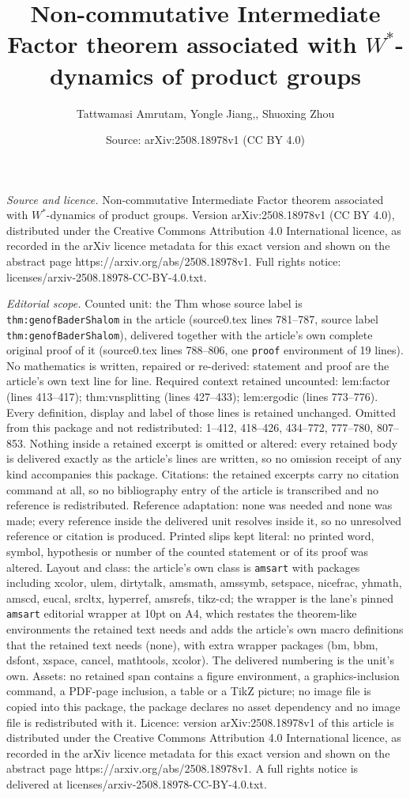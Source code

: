 \documentclass[10pt,a4paper]{amsart}
\title[Non-commutative Intermediate Factor theorem associated with ]{Non-commutative Intermediate Factor theorem associated with $W^*$-dynamics of product groups}
\author{Tattwamasi Amrutam, Yongle Jiang,, Shuoxing Zhou}
\date{Source: arXiv:2508.18978v1 (CC BY 4.0)}
\begin{document}
\maketitle

\noindent\emph{Source and licence.} Non-commutative Intermediate Factor theorem associated with $W^*$-dynamics of product groups. Version arXiv:2508.18978v1 (CC BY 4.0), distributed under the Creative Commons Attribution 4.0 International licence, as recorded in the arXiv licence metadata for this exact version and shown on the abstract page https://arxiv.org/abs/2508.18978v1. Full rights notice: licenses/arxiv-2508.18978-CC-BY-4.0.txt.\par\smallskip

\noindent\textit{Editorial scope.} Counted unit: the Thm whose source label is \texttt{thm:genofBaderShalom} in the article (source0.tex lines 781--787, source label \texttt{thm:genofBaderShalom}), delivered together with the article's own complete original proof of it (source0.tex lines 788--806, one \texttt{proof} environment of 19 lines). No mathematics is written, repaired or re-derived: statement and proof are the article's own text line for line. Required context retained uncounted: lem:factor (lines 413--417); thm:vnsplitting (lines 427--433); lem:ergodic (lines 773--776). Every definition, display and label of those lines is retained unchanged. Omitted from this package and not redistributed: 1--412, 418--426, 434--772, 777--780, 807--853. Nothing inside a retained excerpt is omitted or altered: every retained body is delivered exactly as the article's lines are written, so no omission receipt of any kind accompanies this package. Citations: the retained excerpts carry no citation command at all, so no bibliography entry of the article is transcribed and no reference is redistributed. Reference adaptation: none was needed and none was made; every reference inside the delivered unit resolves inside it, so no unresolved reference or citation is produced. Printed slips kept literal: no printed word, symbol, hypothesis or number of the counted statement or of its proof was altered. Layout and class: the article's own class is \texttt{amsart} with packages including xcolor, ulem, dirtytalk, amsmath, amssymb, setspace, nicefrac, yhmath, amscd, eucal, srcltx, hyperref, amsrefs, tikz-cd; the wrapper is the lane's pinned \texttt{amsart} editorial wrapper at 10pt on A4, which restates the theorem-like environments the retained text needs and adds the article's own macro definitions that the retained text needs (none), with extra wrapper packages (bm, bbm, dsfont, xspace, cancel, mathtools, xcolor). The delivered numbering is the unit's own. Assets: no retained span contains a figure environment, a graphics-inclusion command, a PDF-page inclusion, a table or a TikZ picture; no image file is copied into this package, the package declares no asset dependency and no image file is redistributed with it. Licence: version arXiv:2508.18978v1 of this article is distributed under the Creative Commons Attribution 4.0 International licence, as recorded in the arXiv licence metadata for this exact version and shown on the abstract page https://arxiv.org/abs/2508.18978v1. A full rights notice is delivered at licenses/arxiv-2508.18978-CC-BY-4.0.txt. 
\end{document}
